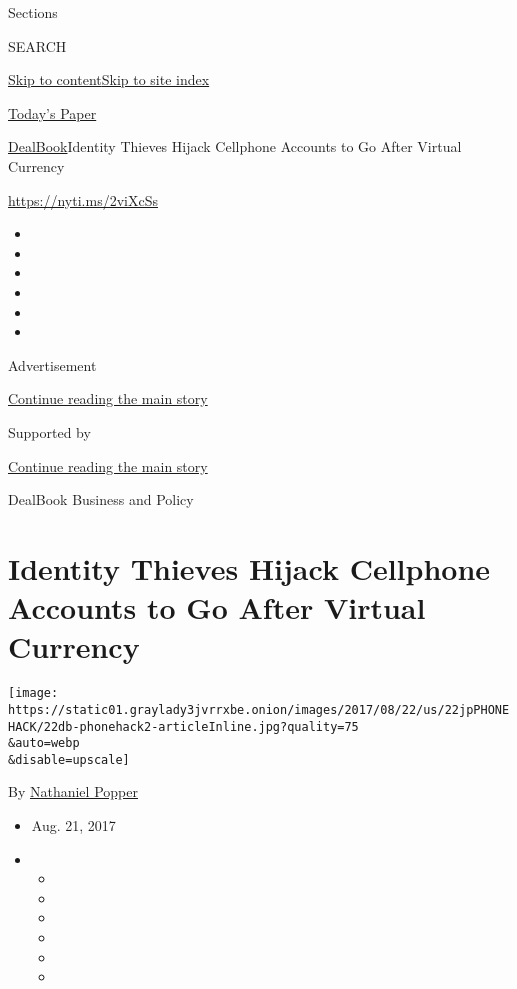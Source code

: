 Sections

SEARCH

\protect\hyperlink{site-content}{Skip to
content}\protect\hyperlink{site-index}{Skip to site index}

\href{https://myaccount.nytimes3xbfgragh.onion/auth/login?response_type=cookie\&client_id=vi}{}

\href{https://www.nytimes3xbfgragh.onion/section/todayspaper}{Today's
Paper}

\href{/section/business/dealbook}{DealBook}\textbar{}Identity Thieves
Hijack Cellphone Accounts to Go After Virtual Currency

\url{https://nyti.ms/2viXcSs}

\begin{itemize}
\item
\item
\item
\item
\item
\item
\end{itemize}

Advertisement

\protect\hyperlink{after-top}{Continue reading the main story}

Supported by

\protect\hyperlink{after-sponsor}{Continue reading the main story}

DealBook Business and Policy

\hypertarget{identity-thieves-hijack-cellphone-accounts-to-go-after-virtual-currency}{%
\section{Identity Thieves Hijack Cellphone Accounts to Go After Virtual
Currency}\label{identity-thieves-hijack-cellphone-accounts-to-go-after-virtual-currency}}

\texttt{[image: https://static01.graylady3jvrrxbe.onion/images/2017/08/22/us/22jpPHONEHACK/22db-phonehack2-articleInline.jpg?quality=75\\\&auto=webp\\\&disable=upscale]}

By
\href{http://www.nytimes3xbfgragh.onion/by/nathaniel-popper}{Nathaniel
Popper}

\begin{itemize}
\item
  Aug. 21, 2017
\item
  \begin{itemize}
  \item
  \item
  \item
  \item
  \item
  \item
  \end{itemize}
\end{itemize}

